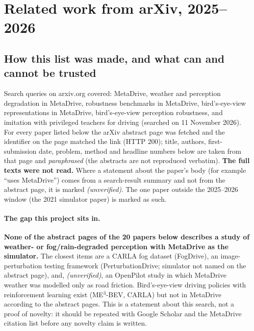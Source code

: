 \section{Related work from arXiv, 2025--2026}\label{sec:related}

\subsection{How this list was made, and what can and cannot be trusted}
Search queries on arxiv.org covered: MetaDrive, weather and perception degradation in MetaDrive, robustness benchmarks in MetaDrive, bird's-eye-view representations in MetaDrive, bird's-eye-view perception robustness, and imitation with privileged teachers for driving (searched on 11 November 2026).
For every paper listed below the arXiv abstract page was fetched and the identifier on the page matched the link (HTTP 200); title, authors, first-submission date, problem, method and headline numbers below are taken from that page and \emph{paraphrased} (the abstracts are not reproduced verbatim).
\textbf{The full texts were not read.} Where a statement about the paper's body (for example ``uses MetaDrive'') comes from a search-result summary and not from the abstract page, it is marked \emph{(unverified)}. The one paper outside the 2025--2026 window (the 2021 simulator paper) is marked as such.

\paragraph{The gap this project sits in.} \textbf{None of the abstract pages of the 20 papers below describes a study of weather- or fog/rain-degraded perception with MetaDrive as the simulator.} The closest items are a CARLA fog dataset (FogDrive), an image-perturbation testing framework (PerturbationDrive; simulator not named on the abstract page), and, \emph{(unverified)}, an OpenPilot study in which MetaDrive weather was modelled only as road friction.
Bird's-eye-view driving policies with reinforcement learning exist (ME$^3$-BEV, CARLA) but not in MetaDrive according to the abstract pages. This is a statement about this search, not a proof of novelty: it should be repeated with Google Scholar and the MetaDrive citation list before any novelty claim is written.

